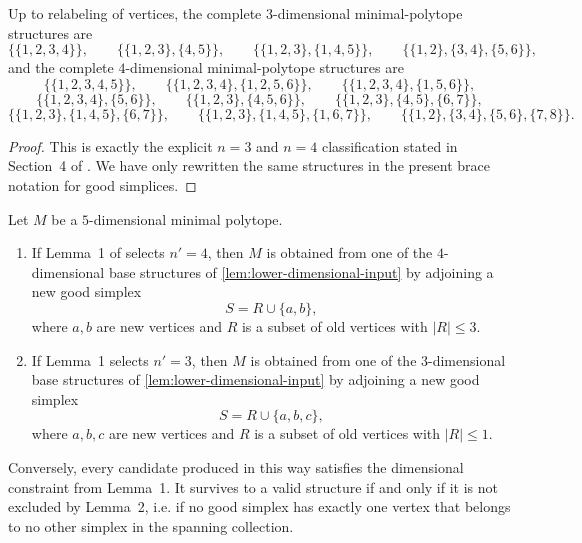 \begin{lemma}
\label{lem:lower-dimensional-input}
Up to relabeling of vertices, the complete $3$-dimensional minimal-polytope
structures are
\[
  \{\{1,2,3,4\}\},\qquad
  \{\{1,2,3\},\{4,5\}\},\qquad
  \{\{1,2,3\},\{1,4,5\}\},\qquad
  \{\{1,2\},\{3,4\},\{5,6\}\},
\]
and the complete $4$-dimensional minimal-polytope structures are
\[
  \{\{1,2,3,4,5\}\},\qquad
  \{\{1,2,3,4\},\{1,2,5,6\}\},\qquad
  \{\{1,2,3,4\},\{1,5,6\}\},
\]
\[
  \{\{1,2,3,4\},\{5,6\}\},\qquad
  \{\{1,2,3\},\{4,5,6\}\},\qquad
  \{\{1,2,3\},\{4,5\},\{6,7\}\},
\]
\[
  \{\{1,2,3\},\{1,4,5\},\{6,7\}\},\qquad
  \{\{1,2,3\},\{1,4,5\},\{1,6,7\}\},\qquad
  \{\{1,2\},\{3,4\},\{5,6\},\{7,8\}\}.
\]
\end{lemma}

\begin{proof}
This is exactly the explicit $n=3$ and $n=4$ classification stated in
Section~4 of \citet{KreuzerSkarke1997}.  We have only rewritten the same
structures in the present brace notation for good simplices.
\end{proof}

\begin{lemma}
\label{lem:5d-extension-rule}
Let $M$ be a $5$-dimensional minimal polytope.
\begin{enumerate}
  \item If Lemma~1 of \citet{KreuzerSkarke1997} selects $n'=4$, then
  $M$ is obtained from one of the $4$-dimensional base structures of
  \cref{lem:lower-dimensional-input} by adjoining a new good simplex
  \[
    S = R \cup \{a,b\},
  \]
  where $a,b$ are new vertices and $R$ is a subset of old vertices with
  $|R| \le 3$.
  \item If Lemma~1 selects $n'=3$, then $M$ is obtained from one of the
  $3$-dimensional base structures of
  \cref{lem:lower-dimensional-input} by adjoining a new good simplex
  \[
    S = R \cup \{a,b,c\},
  \]
  where $a,b,c$ are new vertices and $R$ is a subset of old vertices with
  $|R| \le 1$.
\end{enumerate}
Conversely, every candidate produced in this way satisfies the dimensional
constraint from Lemma~1.  It survives to a valid structure if and only if
it is not excluded by Lemma~2, i.e. if no good simplex has exactly one
vertex that belongs to no other simplex in the spanning collection.
\end{lemma}

